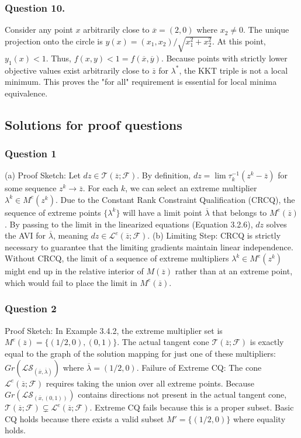 \documentclass[pdflatex,sn-mathphys-num]{sn-jnl}%
\theoremstyle{definition}
\begin{document}
\subsubsection*{Question 10.}
Consider any point $x$ arbitrarily close to $\overline{x}=(2,0)$ where $x_2 \neq 0$. The unique projection onto the circle is $y(x) = (x_1, x_2)/\sqrt{x_1^2+x_2^2}$.
At this point, $y_1(x) < 1$. Thus, $f(x,y) < 1 = f(\overline{x},\overline{y})$.
Because points with strictly lower objective values exist arbitrarily close to $\overline{z}$ for $\lambda^*$, the KKT triple is not a local minimum. This proves the "for all" requirement is essential for local minima equivalence.


\subsection{Solutions for proof questions}
\subsubsection*{Question 1}
(a) Proof Sketch: Let $dz \in \mathcal{T}(\overline{z}; \mathcal{F})$. By definition, $dz = \lim \tau_k^{-1}(z^k - \overline{z})$ for some sequence $z^k \to \overline{z}$. For each $k$, we can select an extreme multiplier $\lambda^k \in M^e(z^k)$. Due to the Constant Rank Constraint Qualification (CRCQ), the sequence of extreme points $\{\lambda^k\}$ will have a limit point $\overline{\lambda}$ that belongs to $M^e(\overline{z})$. By passing to the limit in the linearized equations (Equation 3.2.6), $dz$ solves the AVI for $\overline{\lambda}$, meaning $dz \in \mathcal{L}^e(\overline{z}; \mathcal{F})$. 
(b) Limiting Step: CRCQ is strictly necessary to guarantee that the limiting gradients maintain linear independence. Without CRCQ, the limit of a sequence of extreme multipliers $\lambda^k \in M^e(z^k)$ might end up in the relative interior of $M(\overline{z})$ rather than at an extreme point, which would fail to place the limit in $M^e(\overline{z})$.

\subsubsection*{Question 2}
Proof Sketch: In Example 3.4.2, the extreme multiplier set is $M^e(\overline{z}) = \{(1/2,0), (0,1)\}$. The actual tangent cone $\mathcal{T}(\overline{z}; \mathcal{F})$ is exactly equal to the graph of the solution mapping for just one of these multipliers: $Gr(\mathcal{LS}_{(\overline{x}, \overline{\lambda})})$ where $\overline{\lambda} = (1/2,0)$. 
Failure of Extreme CQ: The cone $\mathcal{L}^e(\overline{z}; \mathcal{F})$ requires taking the union over all extreme points. Because $Gr(\mathcal{LS}_{(\overline{x}, (0,1))})$ contains directions not present in the actual tangent cone, $\mathcal{T}(\overline{z}; \mathcal{F}) \subsetneq \mathcal{L}^e(\overline{z}; \mathcal{F})$. Extreme CQ fails because this is a proper subset. Basic CQ holds because there exists a valid subset $M' = \{(1/2,0)\}$ where equality holds.
\end{document}
